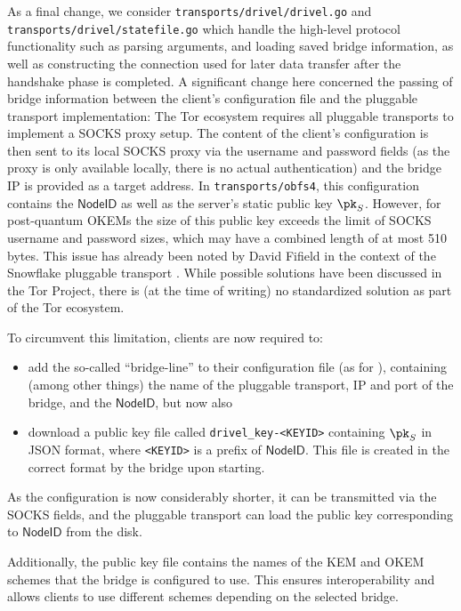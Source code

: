 As a final change, we consider \texttt{transports/drivel/drivel.go} and \texttt{transports/drivel/statefile.go} which handle the high-level protocol functionality such as parsing arguments, and loading saved bridge information, as well as constructing the connection used for later data transfer after the handshake phase is completed.
A significant change here concerned the passing of bridge information between the client's configuration file and the pluggable transport implementation: The Tor ecosystem requires all pluggable transports to implement a SOCKS proxy setup. The content of the client's configuration is then sent to its local SOCKS proxy via the username and password fields (as the proxy is only available locally, there is no actual authentication) and the bridge IP is provided as a target address. In \texttt{transports/obfs4}, this configuration contains the $\mathsf{NodeID}$ as well as the server's static public key $\pk_S$. However, for post-quantum OKEMs the size of this public key exceeds the limit of SOCKS username and password sizes, which may have a combined length of at most 510 bytes. This issue has already been noted by David Fifield in the context of the Snowflake pluggable transport \cite{torprojectSnowflakeBridge}. While possible solutions have been discussed in the Tor Project, there is (at the time of writing) no standardized solution as part of the Tor ecosystem.

To circumvent this limitation, clients are now required to:
\begin{itemize}
    \item add the so-called ``bridge-line'' to their configuration file (as for \obfsfour{}), containing (among other things) the name of the pluggable transport, IP and port of the bridge, and the $\mathsf{NodeID}$, but now also
    \item download a public key file called \texttt{drivel\_key-<KEYID>} containing $\pk_S$ in JSON format, where \texttt{<KEYID>} is a prefix of $\mathsf{NodeID}$. This file is created in the correct format by the bridge upon starting.
\end{itemize}

As the configuration is now considerably shorter, it can be transmitted via the SOCKS fields, and the pluggable transport can load the public key corresponding to $\mathsf{NodeID}$ from the disk.

Additionally, the public key file contains the names of the KEM and OKEM schemes that the bridge is configured to use. This ensures interoperability and allows clients to use different schemes depending on the selected bridge.

